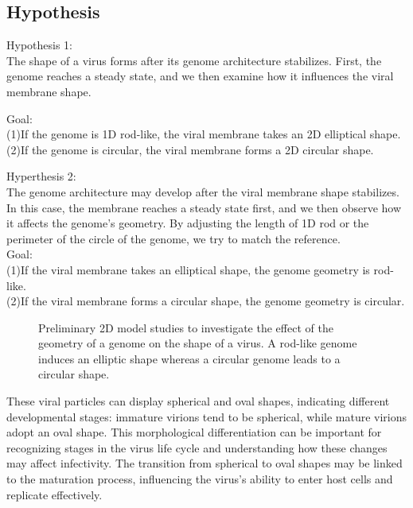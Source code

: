 \documentclass[12pt]{article}
\begin{document}
\begin{flushleft}
\subsection*{Hypothesis}

\noindent Hypothesis 1:\\
The shape of a virus forms after its genome architecture stabilizes. First, the genome reaches a steady state, and we then examine how it influences the viral membrane shape. 

\noindent Goal:\\
	(1)If the genome is 1D rod-like, the viral membrane takes an 2D elliptical shape.\\
	(2)If the genome is circular, the viral membrane forms a 2D circular shape.
	
\noindent Hyperthesis 2:\\
The genome architecture may develop after the viral membrane shape stabilizes. In this case, the membrane reaches a steady state first, and we then observe how it affects the genome’s geometry. By adjusting the length of 1D rod or the perimeter of the circle of the genome, we try to match the reference.\cite{goldsmith2003monkeypox}\\ 
\noindent Goal:\\
	(1)If the viral membrane takes an elliptical shape, the genome geometry is rod-like\cite{harish2021entomopathogenic}.	\\
	(2)If the viral membrane forms a circular shape, the genome geometry is circular.
		

	
\begin{figure}[!ht]
  \centering
  \caption{Preliminary 2D model studies to
investigate the effect of the geometry of a
genome on the shape of a virus. A rod-like
genome induces an elliptic shape whereas a
circular genome leads to a circular shape.}
\end{figure}
	

These viral particles can display spherical and oval shapes, indicating different developmental stages: immature virions tend to be spherical, while mature virions adopt an oval shape. This morphological differentiation can be important for recognizing stages in the virus life cycle and understanding how these changes may affect infectivity. The transition from spherical to oval shapes may be linked to the maturation process, influencing the virus's ability to enter host cells and replicate effectively.\\


\end{flushleft}
\end{document}
